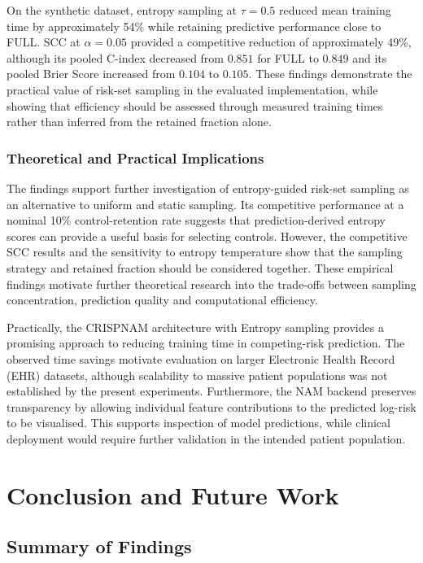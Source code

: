 \documentclass[a4paper,twoside,12pt]{report}
\begin{document}
On the synthetic dataset, entropy sampling at $\tau=0.5$ reduced mean training time by approximately 54\% while retaining predictive performance close to FULL. SCC at $\alpha=0.05$ provided a competitive reduction of approximately 49\%, although its pooled C-index decreased from $0.851$ for FULL to $0.849$ and its pooled Brier Score increased from $0.104$ to $0.105$. These findings demonstrate the practical value of risk-set sampling in the evaluated implementation, while showing that efficiency should be assessed through measured training times rather than inferred from the retained fraction alone.

\subsection{Theoretical and Practical Implications}

The findings support further investigation of entropy-guided risk-set sampling as an alternative to uniform and static sampling. Its competitive performance at a nominal 10\% control-retention rate suggests that prediction-derived entropy scores can provide a useful basis for selecting controls. However, the competitive SCC results and the sensitivity to entropy temperature show that the sampling strategy and retained fraction should be considered together. These empirical findings motivate further theoretical research into the trade-offs between sampling concentration, prediction quality and computational efficiency.

Practically, the CRISPNAM architecture with Entropy sampling provides a promising approach to reducing training time in competing-risk prediction. The observed time savings motivate evaluation on larger Electronic Health Record (EHR) datasets, although scalability to massive patient populations was not established by the present experiments. Furthermore, the NAM backend preserves transparency by allowing individual feature contributions to the predicted log-risk to be visualised. This supports inspection of model predictions, while clinical deployment would require further validation in the intended patient population.


\chapter{Conclusion and Future Work}

\section{Summary of Findings}
\end{document}
